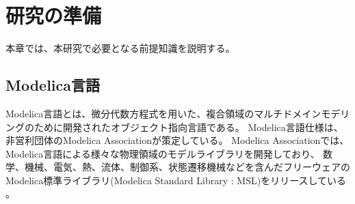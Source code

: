 \chapter{研究の準備}\label{cha:Preparation}
  \vspace{-2zh}
本章では、本研究で必要となる前提知識を説明する。
  \vspace{-1zh}
\section{Modelica言語}\label{modelica}
Modelica言語とは、微分代数方程式を用いた、複合領域のマルチドメインモデリングのために開発されたオブジェクト指向言語である\cite{modelicaモデルベース本}。
Modelica言語仕様は、非営利団体のModelica Associationが策定している。
Modelica Associationでは、Modelica言語による様々な物理領域のモデルライブラリを開発しており、
数学、機械、電気、熱、流体、制御系、状態遷移機械などを含んだフリーウェアのModelica標準ライブラリ(Modelica Standard Library : MSL)をリリースしている
\cite{modelicaモデルベース本}。
  \vspace{-1zh}
